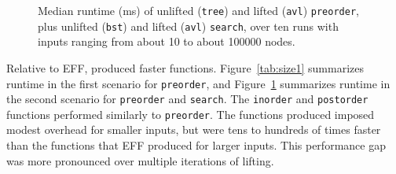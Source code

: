 \begin{figure}
\small
{}
\vspace{-0.25cm}
\caption{Median runtime (ms) of unlifted (\lstinline{tree}) and lifted (\lstinline{avl}) \lstinline{preorder},
plus unlifted (\lstinline{bst}) and lifted (\lstinline{avl}) \lstinline{search}, over ten runs with inputs ranging from about 10 to about 100000 nodes.}
\label{tab:size2}
\end{figure}

Relative to EFF, \toolnameb produced faster functions.
Figure~\ref{tab:size1} summarizes
runtime in the first scenario for \lstinline{preorder},
and Figure~\ref{tab:size2} summarizes
runtime in the second scenario for \lstinline{preorder} and \lstinline{search}.
The \lstinline{inorder} and \lstinline{postorder} functions performed similarly to \lstinline{preorder}.
The functions \toolnameb produced imposed modest overhead for smaller inputs, but were
tens to hundreds of times faster than the functions that EFF produced for larger inputs.
This performance gap was more pronounced over multiple iterations of lifting.

